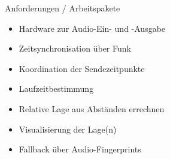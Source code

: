 \documentclass[fleqn,11pt]{beamer}
\begin{document}
\begin{frame}{Anforderungen / Arbeitspakete}
\begin{itemize}
  \item Hardware zur Audio-Ein- und -Ausgabe
  \item Zeitsynchronisation über Funk
  \item Koordination der Sendezeitpunkte
  \item Laufzeitbestimmung
  \item Relative Lage aus Abständen errechnen
  \item Visualisierung der Lage(n)
  \item Fallback über Audio-Fingerprints
\end{itemize}
\end{frame}
\end{document}
